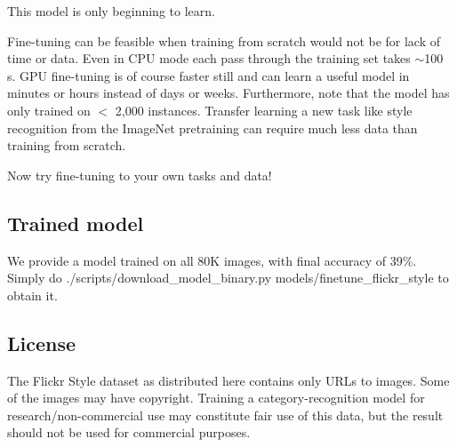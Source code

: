 This model is only beginning to learn.

Fine-\/tuning can be feasible when training from scratch would not be for lack of time or data. Even in C\+PU mode each pass through the training set takes $\sim$100 s. G\+PU fine-\/tuning is of course faster still and can learn a useful model in minutes or hours instead of days or weeks. Furthermore, note that the model has only trained on $<$ 2,000 instances. Transfer learning a new task like style recognition from the Image\+Net pretraining can require much less data than training from scratch.

Now try fine-\/tuning to your own tasks and data!

\subsection*{Trained model}

We provide a model trained on all 80K images, with final accuracy of 39\%. Simply do {\ttfamily ./scripts/download\+\_\+model\+\_\+binary.py models/finetune\+\_\+flickr\+\_\+style} to obtain it.

\subsection*{License}

The Flickr Style dataset as distributed here contains only U\+R\+Ls to images. Some of the images may have copyright. Training a category-\/recognition model for research/non-\/commercial use may constitute fair use of this data, but the result should not be used for commercial purposes. 